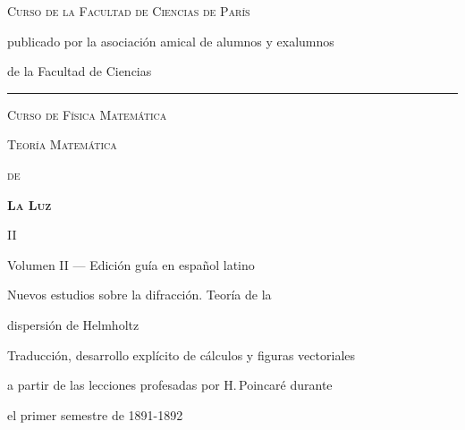 \begin{titlepage}
\centering
\vspace*{1.5cm}

{\color{azulpoincare}\small\scshape Curso de la Facultad de Ciencias de París\par}
{\color{grisnota}\footnotesize publicado por la asociación amical de alumnos y exalumnos\par
de la Facultad de Ciencias\par}

\vspace{2pt}
\color{rojopoincare}\rule{0.55\textwidth}{0.6pt}
\color{black}
\vspace{18pt}

{\color{azulpoincare}\scshape\large Curso de Física Matemática\par}

\vspace{28pt}

{\color{azulpoincare}\scshape\Large Teoría Matemática\par}
{\color{azulpoincare}\scshape\large de\par}
{\color{azulpoincare}\bfseries\scshape\Huge La Luz\par}

\vspace{10pt}
{\color{rojopoincare}\large II\par}

\vspace{20pt}

{\small Volumen II — Edición guía en español latino\par}
{\footnotesize Nuevos estudios sobre la difracción. Teoría de la\par
dispersión de Helmholtz\par}
{\footnotesize Traducción, desarrollo explícito de cálculos y figuras vectoriales\par
a partir de las lecciones profesadas por H.\,Poincaré durante\par
el primer semestre de 1891-1892\par}

\vspace{40pt}


\end{titlepage}
